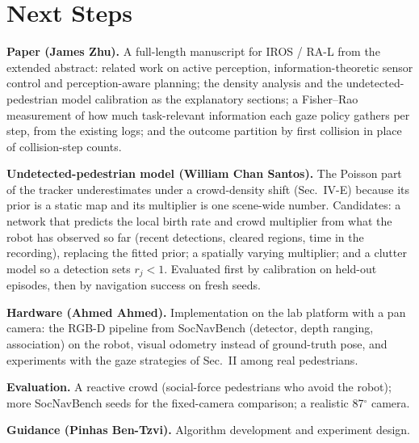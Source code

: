 \documentclass[letterpaper, 10 pt, conference]{ieeeconf}
\begin{document}
\section{Next Steps}
\textbf{Paper (James Zhu).} A full-length manuscript for IROS / RA-L from the extended abstract: related work on active perception, information-theoretic sensor control and perception-aware planning; the density analysis and the undetected-pedestrian model calibration as the explanatory sections; a Fisher--Rao measurement of how much task-relevant information each gaze policy gathers per step, from the existing logs; and the outcome partition by first collision in place of collision-step counts.

\textbf{Undetected-pedestrian model (William Chan Santos).} The Poisson part of the tracker underestimates under a crowd-density shift (Sec.~IV-E) because its prior is a static map and its multiplier is one scene-wide number. Candidates: a network that predicts the local birth rate and crowd multiplier from what the robot has observed so far (recent detections, cleared regions, time in the recording), replacing the fitted prior; a spatially varying multiplier; and a clutter model so a detection sets $r_j<1$. Evaluated first by calibration on held-out episodes, then by navigation success on fresh seeds.

\textbf{Hardware (Ahmed Ahmed).} Implementation on the lab platform with a pan camera: the RGB-D pipeline from SocNavBench (detector, depth ranging, association) on the robot, visual odometry instead of ground-truth pose, and experiments with the gaze strategies of Sec.~II among real pedestrians.

\textbf{Evaluation.} A reactive crowd (social-force pedestrians who avoid the robot); more SocNavBench seeds for the fixed-camera comparison; a realistic 87$^\circ$ camera.

\textbf{Guidance (Pinhas Ben-Tzvi).} Algorithm development and experiment design.



\end{document}
